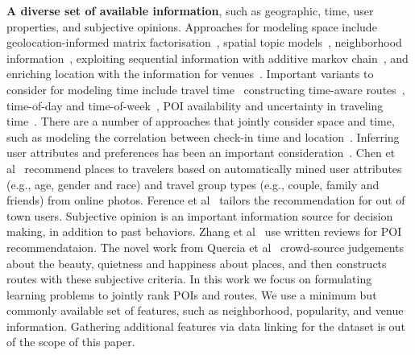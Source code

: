 {\bf A diverse set of available information}, 
such as geographic, time, user properties, and subjective opinions. 
Approaches for modeling space include geolocation-informed matrix factorisation~\cite{lian2014geomf}, spatial topic models~\cite{hu2013spatialtopic}, neighborhood information~\cite{liu2014exploiting}, exploiting sequential information with additive markov chain~\cite{zhang2014lore}, and enriching location with the information for venues~\cite{deveaud2014importance,deveaud2015experiments}.
Important variants to consider for modeling time include travel time~\cite{gao2013temporal}
constructing time-aware routes~\cite{yuan2013timeaware,hsieh2014mining}, time-of-day and time-of-week~\cite{chen2015tripplanner}, POI availability and uncertainty in traveling time~\cite{zhang2015personalized}. There are a number of approaches that jointly consider space and time\cite{yuan2014graph,zhang2015location}, such as modeling the correlation between check-in time and location~\cite{gao2013temporal}. 
Inferring user attributes and preferences has been an important consideration~\cite{liu2013personalized}. 
Chen et al~\cite{chen2013people} recommend places to travelers based on automatically mined user attributes 
(e.g., age, gender and race) and travel group types (e.g., couple, family and friends) from online photos.
Ference et al~\cite{ference2013location} tailors the recommendation for out of town users.
Subjective opinion is an important information source for decision making, in addition to past behaviors. Zhang et al~\cite{Zhang2015OOP} use written reviews for POI recommendataion.  
The novel work from Quercia et al~\cite{ht14} crowd-source judgements about the beauty, quietness and happiness about places, and then constructs routes with these subjective criteria. 
In this work we focus on formulating learning problems to jointly rank POIs and routes. We use a minimum but commonly available set of features, such as neighborhood, popularity, and venue information. Gathering additional features via data linking for the dataset is out of the scope of this paper. 

